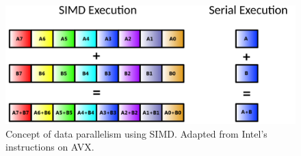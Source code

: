 \documentclass[12pt, a4paper]{article}
\begin{document}
\begin{figure}
  \centering
  \includegraphics[scale=0.6]{simd_ex.png}
  \caption{Concept of data parallelism using SIMD. Adapted from Intel's instructions on AVX. \cite{Intel_AVX}}
  \label{simd_ex}
\end{figure}
\end{document}

